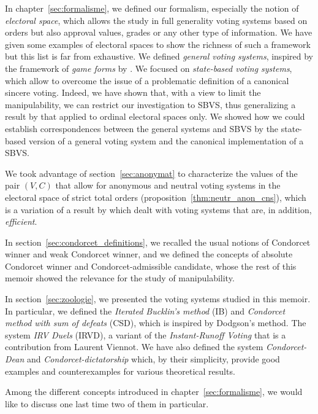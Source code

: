 \medskip
In chapter~\ref{sec:formalisme}, we defined our formalism, especially the notion of \emph{electoral space}, which allows the study in full generality voting systems based on orders but also approval values, grades or any other type of information. We have given some examples of electoral spaces to show the richness of such a framework but this list is far from exhaustive. We defined \emph{general voting systems}, inspired by the framework of \emph{game forms} by \cite{gibbard1973manipulation}. We focused on \emph{state-based voting systems}, which allow to overcome the issue of a problematic definition of a canonical sincere voting. Indeed, we have shown that, with a view to limit the manipulability, we can restrict our investigation to SBVS, thus generalizing a result by \cite{moulin1978strategie} that applied to ordinal electoral spaces only. We showed how we could establish correspondences between the general systems and SBVS by the state-based version of a general voting system and the canonical implementation of a SBVS.

We took advantage of section~\ref{sec:anonymat} to characterize the values of the pair $(V, C)$ that allow for anonymous and neutral voting systems in the electoral space of strict total orders (proposition~\ref{thm:neutr_anon_cns}), which is a variation of a result by \cite{moulin1978strategie} which dealt with voting systems that are, in addition, \emph{efficient}.

In section~\ref{sec:condorcet_definitions}, we recalled the usual notions of Condorcet winner and weak Condorcet winner, and we defined the concepts of absolute Condorcet winner and Condorcet-admissible candidate, whose the rest of this memoir showed the relevance for the study of manipulability.

In section~\ref{sec:zoologie}, we presented the voting systems studied in this memoir. In particular, we defined the \emph{Iterated Bucklin's method} (IB) and \emph{Condorcet method with sum of defeats} (CSD), which is inspired by Dodgson's method. The system \emph{IRV Duels} (IRVD), a variant of the \emph {Instant-Runoff Voting} that is a contribution from Laurent Viennot. We have also defined the system \emph{Condorcet-Dean} and \emph{Condorcet-dictatorship} which, by their simplicity, provide good examples and counterexamples for various theoretical results.

\medskip
Among the different concepts introduced in chapter~\ref{sec:formalisme}, we would like to discuss one last time two of them in particular.

